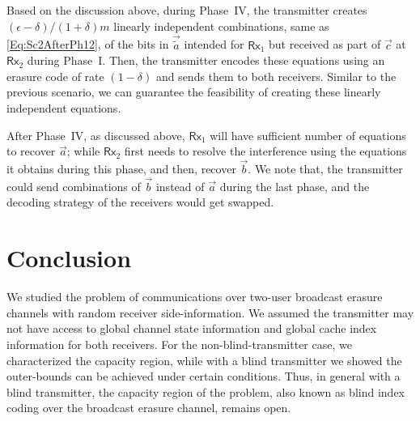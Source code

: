 \documentclass[journal,12pt,draftcls,onecolumn]{IEEEtran}
\def\red{\color{red}}
\newcommand{\msf}{\mathsf}
\newcommand{\lp}{\left(}
\newcommand{\rp}{\right)}
\begin{document}
Based on the discussion above, during Phase~IV, the transmitter creates
$
 \lp \epsilon - \delta \rp / \lp 1+\delta \rp m
$
linearly independent combinations, same as \eqref{Eq:Sc2AfterPh12}, of the bits in $\vec{\tilde{a}}$ intended for $\msf{Rx}_1$ but received as part of $\vec{c}$ at  $\msf{Rx}_2$ during Phase~I. Then, the transmitter encodes these equations using an erasure code of rate $\lp 1-\delta \rp$ and sends them to both receivers. Similar to the previous scenario, we can guarantee the feasibility of creating these linearly independent equations.

After Phase~IV, as discussed above, $\msf{Rx}_1$ will have sufficient number of equations to recover $\vec{a}$; while $\msf{Rx}_2$ first needs to resolve the interference using the equations it obtains during this phase, and then, recover $\vec{b}$. We note that, the transmitter could send combinations of $\vec{b}$ instead of $\vec{a}$ during the last phase, and the decoding strategy of the receivers would get swapped.






\section{Conclusion}
\label{Section:Conclusion_BIC}

We studied the problem of communications over two-user broadcast erasure channels with random receiver side-information. We assumed the transmitter may not have access to global channel state information and global cache index information for both receivers. For the non-blind-transmitter case, we characterized the capacity region, while with a blind transmitter we showed the outer-bounds can be achieved under certain conditions. Thus, in general with a blind transmitter, the capacity region of the problem, also known as blind index coding over the broadcast erasure channel, remains open.
\end{document}
